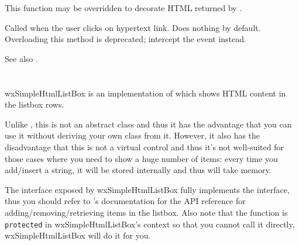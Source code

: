 \label{wxhtmllistboxongetitemmarkup}


This function may be overridden to decorate HTML returned by
.

\label{wxhtmlistboxonlinkclicked}


Called when the user clicks on hypertext link. Does nothing by default.
Overloading this method is deprecated; intercept the event instead.





See also .







%
%


\section{}\label{wxsimplehtmllistbox}

wxSimpleHtmlListBox is an implementation of  which
shows HTML content in the listbox rows.

Unlike , this is not an abstract class and thus it
has the advantage that you can use it without deriving your own class from it.
However, it also has the disadvantage that this is not a virtual control and thus it's not
well-suited for those cases where you need to show a huge number of items: every time you
add/insert a string, it will be stored internally and thus will take memory.

The interface exposed by wxSimpleHtmlListBox fully implements the
 interface, thus you should refer to
's documentation for the API reference
for adding/removing/retrieving items in the listbox.
Also note that the  function is
{\tt protected} in wxSimpleHtmlListBox's context so that you cannot call it directly,
wxSimpleHtmlListBox will do it for you.

